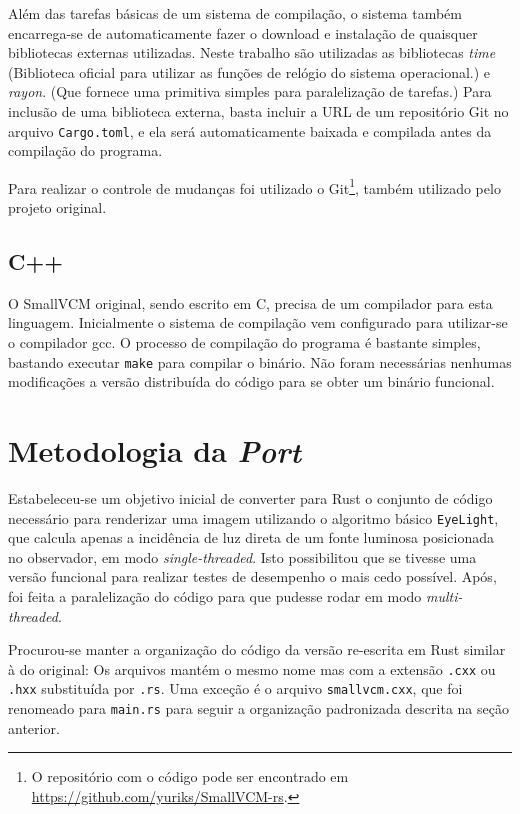 \documentclass[tg]{mdtufsm}
\def\Cpp{{C\nolinebreak[4]\raisebox{.20ex}{\small\bf++}}}
\begin{document}
Além das tarefas básicas de um sistema de compilação, o sistema também encarrega-se de automaticamente fazer o download e instalação de quaisquer bibliotecas externas utilizadas. Neste trabalho são utilizadas as bibliotecas \emph{time} (Biblioteca oficial para utilizar as funções de relógio do sistema operacional.) e \emph{rayon}. (Que fornece uma primitiva simples para paralelização de tarefas.) Para inclusão de uma biblioteca externa, basta incluir a URL de um repositório Git no arquivo \texttt{Cargo.toml}, e ela será automaticamente baixada e compilada antes da compilação do programa.

Para realizar o controle de mudanças foi utilizado o Git\footnote{O repositório com o código pode ser encontrado em \url{https://github.com/yuriks/SmallVCM-rs}.}, também utilizado pelo projeto original.

\subsection{C++}

O SmallVCM original, sendo escrito em \Cpp, precisa de um compilador para esta linguagem. Inicialmente o sistema de compilação vem configurado para utilizar-se o compilador gcc. O processo de compilação do programa é bastante simples, bastando executar \texttt{make} para compilar o binário. Não foram necessárias nenhumas modificações a versão distribuída do código para se obter um binário funcional.

\section{Metodologia da \emph{Port}}

Estabeleceu-se um objetivo inicial de converter para Rust o conjunto de código necessário para renderizar uma imagem utilizando o algoritmo básico \texttt{EyeLight}, que calcula apenas a incidência de luz direta de um fonte luminosa posicionada no observador, em modo \emph{single-threaded}. Isto possibilitou que se tivesse uma versão funcional para realizar testes de desempenho o mais cedo possível. Após, foi feita a paralelização do código para que pudesse rodar em modo \emph{multi-threaded}.

Procurou-se manter a organização do código da versão re-escrita em Rust similar à do original: Os arquivos mantém o mesmo nome mas com a extensão \texttt{.cxx} ou \texttt{.hxx} substituída por \texttt{.rs}. Uma exceção é o arquivo \texttt{smallvcm.cxx}, que foi renomeado para \texttt{main.rs} para seguir a organização padronizada descrita na seção anterior.
\end{document}
